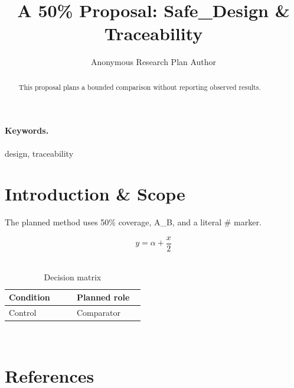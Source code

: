 \documentclass{article}
\title{A 50\% Proposal: Safe\_Design \& Traceability}
\author{Anonymous Research Plan Author}
\begin{document}
\maketitle
\begin{abstract}
This proposal plans a bounded comparison without reporting observed results.
\end{abstract}
\paragraph{Keywords.} design, traceability
\section{Introduction \& Scope}
The planned method uses 50\% coverage, A\_B, and a literal \# marker.~\cite{cite_example_1}

\begin{equation}
y = \alpha + \frac{x}{2}
\label{eq:introduction-B2}
\end{equation}~\cite{cite_example_1}

\begin{table}[htbp]
\centering
\small


\caption{Decision matrix}
\label{tab:introduction-B3}
\begin{tabular}{|p{0.45\linewidth}|p{0.45\linewidth}|}
\hline
Condition & Planned role \\\hline
Control & Comparator \\\hline
\end{tabular}
\end{table}~\cite{cite_example_1}
\section*{References}


\end{document}
